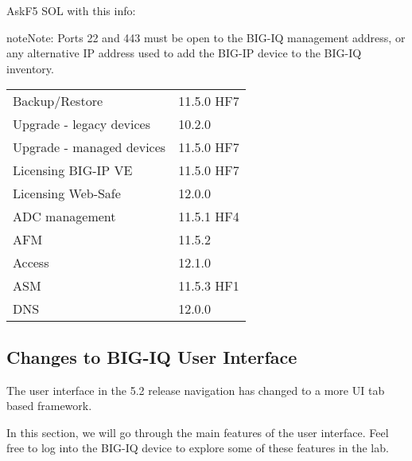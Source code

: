 \documentclass[letterpaper,10pt,english]{sphinxmanual}
\begin{document}
 AskF5 SOL with this info:


\begin{sphinxadmonition}{note}{Note:}
Ports 22 and 443 must be open to the BIG-IQ management
address, or any alternative IP address used to add the BIG-IP device to
the BIG-IQ inventory.
\end{sphinxadmonition}


\begin{savenotes}\sphinxattablestart
\centering
\begin{tabulary}{\linewidth}[t]{|T|T|}
\hline

&
\\
\hline
Backup/Restore
&
11.5.0 HF7
\\
\hline
Upgrade - legacy devices
&
10.2.0
\\
\hline
Upgrade - managed devices
&
11.5.0 HF7
\\
\hline
Licensing BIG-IP VE
&
11.5.0 HF7
\\
\hline
Licensing \textendash{} Web-Safe
&
12.0.0
\\
\hline
ADC management
&
11.5.1 HF4
\\
\hline
AFM
&
11.5.2
\\
\hline
Access
&
12.1.0
\\
\hline
ASM
&
11.5.3 HF1
\\
\hline
DNS
&
12.0.0
\\
\hline
\end{tabulary}
\par
\sphinxattableend\end{savenotes}


\subsection{Changes to BIG-IQ User Interface}
\label{\detokenize{class1/module4/lab3:changes-to-big-iq-user-interface}}\label{\detokenize{class1/module4/lab3::doc}}
The user interface in the 5.2 release navigation has changed to a more
UI tab based framework.

In this section, we will go through the main features of the user
interface. Feel free to log into the BIG-IQ device to explore some of
these features in the lab.
\end{document}
